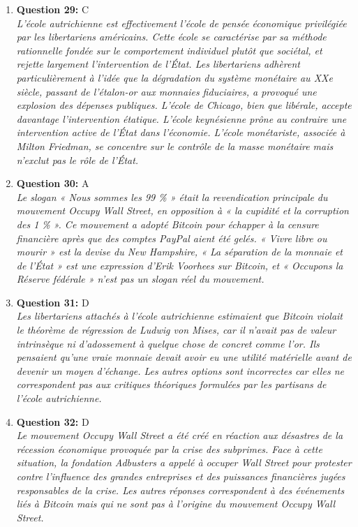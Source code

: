 \documentclass[12pt,a4paper]{article}
\begin{document}
\begin{enumerate}
\item \textbf{Question 29:} C
\\ \textit{L'école autrichienne est effectivement l'école de pensée économique privilégiée par les libertariens américains. Cette école se caractérise par sa méthode rationnelle fondée sur le comportement individuel plutôt que sociétal, et rejette largement l'intervention de l'État. Les libertariens adhèrent particulièrement à l'idée que la dégradation du système monétaire au XXe siècle, passant de l'étalon-or aux monnaies fiduciaires, a provoqué une explosion des dépenses publiques. L'école de Chicago, bien que libérale, accepte davantage l'intervention étatique. L'école keynésienne prône au contraire une intervention active de l'État dans l'économie. L'école monétariste, associée à Milton Friedman, se concentre sur le contrôle de la masse monétaire mais n'exclut pas le rôle de l'État.}

\item \textbf{Question 30:} A
\\ \textit{Le slogan « Nous sommes les 99 \% » était la revendication principale du mouvement Occupy Wall Street, en opposition à « la cupidité et la corruption des 1 \% ». Ce mouvement a adopté Bitcoin pour échapper à la censure financière après que des comptes PayPal aient été gelés. « Vivre libre ou mourir » est la devise du New Hampshire, « La séparation de la monnaie et de l'État » est une expression d'Erik Voorhees sur Bitcoin, et « Occupons la Réserve fédérale » n'est pas un slogan réel du mouvement.}

\item \textbf{Question 31:} D
\\ \textit{Les libertariens attachés à l'école autrichienne estimaient que Bitcoin violait le théorème de régression de Ludwig von Mises, car il n'avait pas de valeur intrinsèque ni d'adossement à quelque chose de concret comme l'or. Ils pensaient qu'une vraie monnaie devait avoir eu une utilité matérielle avant de devenir un moyen d'échange. Les autres options sont incorrectes car elles ne correspondent pas aux critiques théoriques formulées par les partisans de l'école autrichienne.}

\item \textbf{Question 32:} D
\\ \textit{Le mouvement Occupy Wall Street a été créé en réaction aux désastres de la récession économique provoquée par la crise des subprimes. Face à cette situation, la fondation Adbusters a appelé à occuper Wall Street pour protester contre l'influence des grandes entreprises et des puissances financières jugées responsables de la crise. Les autres réponses correspondent à des événements liés à Bitcoin mais qui ne sont pas à l'origine du mouvement Occupy Wall Street.}


\end{enumerate}
\end{document}
